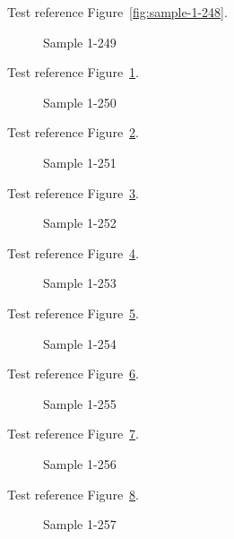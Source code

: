 Test reference Figure~\ref{fig:sample-1-248}.

\begin{figure}[tbhp]
\caption{Sample 1-249}
\label{fig:sample-1-249}
\end{figure}

Test reference Figure~\ref{fig:sample-1-249}.

\begin{figure}[tbhp]
\caption{Sample 1-250}
\label{fig:sample-1-250}
\end{figure}

Test reference Figure~\ref{fig:sample-1-250}.

\begin{figure}[tbhp]
\caption{Sample 1-251}
\label{fig:sample-1-251}
\end{figure}

Test reference Figure~\ref{fig:sample-1-251}.

\begin{figure}[tbhp]
\caption{Sample 1-252}
\label{fig:sample-1-252}
\end{figure}

Test reference Figure~\ref{fig:sample-1-252}.

\begin{figure}[tbhp]
\caption{Sample 1-253}
\label{fig:sample-1-253}
\end{figure}

Test reference Figure~\ref{fig:sample-1-253}.

\begin{figure}[tbhp]
\caption{Sample 1-254}
\label{fig:sample-1-254}
\end{figure}

Test reference Figure~\ref{fig:sample-1-254}.

\begin{figure}[tbhp]
\caption{Sample 1-255}
\label{fig:sample-1-255}
\end{figure}

Test reference Figure~\ref{fig:sample-1-255}.

\begin{figure}[tbhp]
\caption{Sample 1-256}
\label{fig:sample-1-256}
\end{figure}

Test reference Figure~\ref{fig:sample-1-256}.

\begin{figure}[tbhp]
\caption{Sample 1-257}
\label{fig:sample-1-257}
\end{figure}

